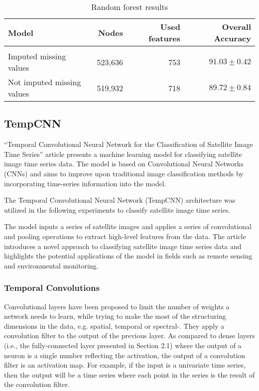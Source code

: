 \begin{table}[!htbp]
  \centering
    \begin{tabular}{lrrr}
    Model                       & Nodes   & Used features & Overall Accuracy             \\[0.2cm] 
    \hline \\[-0.2cm]
    Imputed missing values      & 523,636  & 753          & $91.03 \pm 0.42$\\
    Not imputed missing values  & 519,932  & 718          & $89.72 \pm 0.84$
    \end{tabular}
  \caption{Random forest results}
  \label{tab:rfresults}
\end{table}


\subsection{TempCNN}

``Temporal Convolutional Neural Network for the Classification of Satellite Image Time Series'' article \cite{tempCNN} presents a machine learning model for classifying satellite image time series data.
The model is based on Convolutional Neural Networks (CNNs) and aims to improve upon traditional image classification methods by incorporating time-series information into the model.

The Temporal Convolutional Neural Network (TempCNN) architecture was utilized in the following experiments to classify satellite image time series.


The model inputs a series of satellite images and applies a series of convolutional and pooling operations to extract high-level features from the data.
The article introduces a novel approach to classifying satellite image time series data and highlights the potential applications of the model in fields such as remote sensing and environmental monitoring.

\subsubsection{Temporal Convolutions}
Convolutional layers have been proposed to limit the number of weights a network needs to learn, while trying to make the most of the structuring dimensions in the data, e.g. spatial, temporal or spectral-\cite{NIPS1989_53c3bce6}.
They apply a convolution filter to the output of the previous layer. As compared to dense layers (i.e., the fully-connected layer presented in Section 2.1) where the output of a neuron is a single number reflecting the activation, the output of a convolution filter is an activation map. 
For example, if the input is a univariate time series, then the output will be a time series where each point in the series is the result of the convolution filter.

